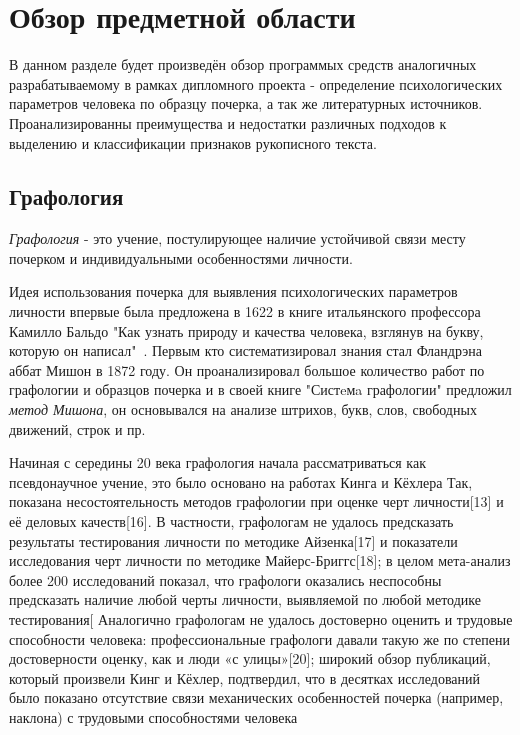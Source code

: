 \section{Обзор предметной области}
\label{sec:domain:intro}

В данном разделе будет произведён обзор программых средств аналогичных разрабатываемому в рамках дипломного проекта - определение психологических параметров человека по образцу почерка, а так же литературных источников. Проанализированны преимущества и недостатки различных подходов к выделению и классификации признаков рукописного текста.

\subsection{Графология}
\label{sub:domain:grafologic}
\emph{Графология} - это учение, постулирующее наличие устойчивой связи месту почерком и индивидуальными особенностями личности.

Идея использования почерка для выявления психологических параметров личности впервые была предложена в 1622 в книге итальянского профессора Камилло Бальдо "Как узнать природу и качества человека, взглянув на букву, которую он написал"~\cite{kamillo_grafology}. Первым кто систематизировал знания стал Фландрэна аббат Мишон в 1872 году. Он проанализировал большое количество работ
по графологии и образцов почерка и в своей книге "Систeмa графологии" предложил \emph{метод Мишона}, он основывался на анализе штрихов, букв, слов, свободных движений, строк и пр.~\cite{mishon_grafology}

Начиная с середины 20 века графология начала рассматриваться как псевдонаучное учение, это было основано на работах Кинга и Кёхлера Так, показана несостоятельность методов графологии при оценке черт личности[13] и её деловых качеств[16]. В частности, графологам не удалось предсказать результаты тестирования личности по методике Айзенка[17] и показатели исследования черт личности по методике Майерс-Бриггс[18]; в целом мета-анализ более 200 исследований показал, что графологи оказались неспособны предсказать наличие любой черты личности, выявляемой по любой методике тестирования[ Аналогично графологам не удалось достоверно оценить и трудовые способности человека: профессиональные графологи давали такую же по степени достоверности оценку, как и люди «с улицы»[20]; широкий обзор публикаций, который произвели Кинг и Кёхлер, подтвердил, что в десятках исследований было показано отсутствие связи механических особенностей почерка (например, наклона) с трудовыми способностями человека

